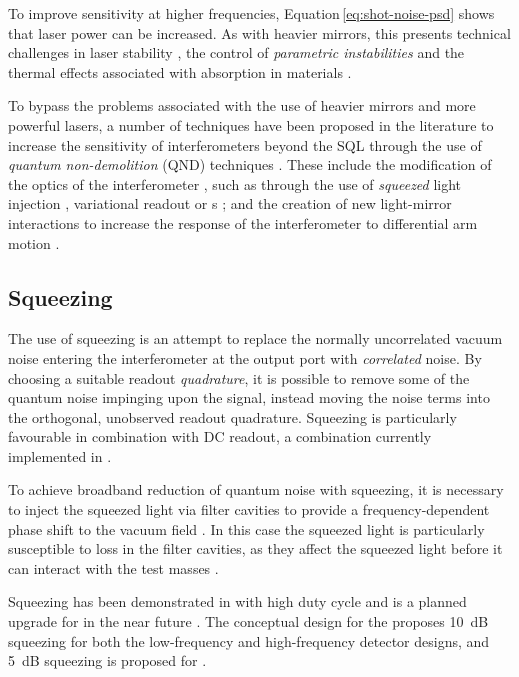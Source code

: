 To improve sensitivity at higher frequencies, Equation\,\ref{eq:shot-noise-psd} shows that laser power can be increased. As with heavier mirrors, this presents technical challenges in laser stability \cite{Hildebrandt2007}, the control of \emph{parametric instabilities} \cite{Evans2015} and the thermal effects associated with absorption in materials \cite{Steinlechner2016}.

To bypass the problems associated with the use of heavier mirrors and more powerful lasers, a number of techniques have been proposed in the literature to increase the sensitivity of interferometers beyond the \gls{SQL} through the use of \emph{quantum non-demolition} (\gls{QND}) techniques \cite{Braginsky1995}. These include the modification of the optics of the interferometer \cite{Kimble2001}, such as through the use of \emph{squeezed} light injection \cite{Caves1981}, variational readout \cite{Vyatchanin1995, Vyatchanin1996} or \SM{}s \cite{Braginsky1990}; and the creation of new light-mirror interactions to increase the response of the interferometer to differential arm motion \cite{Chen2011}.

\subsection{\label{sec:squeezing}Squeezing}
The use of squeezing is an attempt to replace the normally uncorrelated vacuum noise entering the interferometer at the output port with \emph{correlated} noise. By choosing a suitable readout \emph{quadrature}, it is possible to remove some of the quantum noise impinging upon the signal, instead moving the noise terms into the orthogonal, unobserved readout quadrature. Squeezing is particularly favourable in combination with \gls{DC} readout, a combination currently implemented in \GEOHF{} \cite{Willke2006, Affeldt2014}.

To achieve broadband reduction of quantum noise with squeezing, it is necessary to inject the squeezed light via filter cavities to provide a frequency-dependent phase shift to the vacuum field \cite{Kimble2001}. In this case the squeezed light is particularly susceptible to loss in the filter cavities, as they affect the squeezed light before it can interact with the test masses \cite{Kwee2014}.

Squeezing has been demonstrated in \GEOHF{} with high duty cycle \cite{Grote2013} and is a planned upgrade for \ALIGO{} in the near future \cite{Miller2015}. The conceptual design for the \ET{} proposes \SI{10}{\deci\bel} squeezing for both the low-frequency and high-frequency detector designs, and \SI{5}{\deci\bel} squeezing is proposed for \LIGOCE{}.

